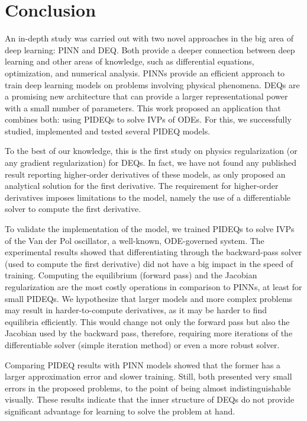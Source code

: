 \chapter{Conclusion}\label{ch:conclusion}

An in-depth study was carried out with two novel approaches in the big area of deep learning: \gls{PINN} and {DEQ}.
Both provide a deeper connection between deep learning and other areas of knowledge, such as differential equations, optimization, and numerical analysis.
\gls{PINN}s provide an efficient approach to train deep learning models on problems involving physical phenomena.
\gls{DEQ}s are a promising new architecture that can provide a larger representational power with a small number of parameters.
This work proposed an application that combines both: using \gls{PIDEQ}s to solve \gls{IVP}s of \gls{ODE}s.
For this, we successfully studied, implemented and tested several \gls{PIDEQ} models.

To the best of our knowledge, this is the first study on physics regularization (or any gradient regularization) for \gls{DEQ}s.
In fact, we have not found any published result reporting higher-order derivatives of these models, as \textcite{Bai2019} only proposed an analytical solution for the first derivative.
The requirement for higher-order derivatives imposes limitations to the model, namely the use of a differentiable solver to compute the first derivative.

To validate the implementation of the model, we trained \gls{PIDEQ}s to solve \gls{IVP}s of the Van der Pol oscillator, a well-known, \gls{ODE}-governed system.
The experimental results showed that differentiating through the backward-pass solver (used to compute the first derivative) did not have a big impact in the speed of training.
Computing the equilibrium (forward pass) and the Jacobian regularization are the most costly operations in comparison to \gls{PINN}s, at least for small \glspl{PIDEQ}.
We hypothesize that larger models and more complex problems may result in harder-to-compute derivatives, as it may be harder to find equilibria efficiently.
This would change not only the forward pass but also the Jacobian used by the backward pass, therefore, requiring more iterations of the differentiable solver (simple iteration method) or even a more robust solver.

Comparing \gls{PIDEQ} results with \gls{PINN} models showed that the former has a larger approximation error and slower training.
Still, both presented very small errors in the proposed problems, to the point of being almost indistinguishable visually.
These results indicate that the inner structure of \glspl{DEQ} do not provide significant advantage for learning to solve the problem at hand.

